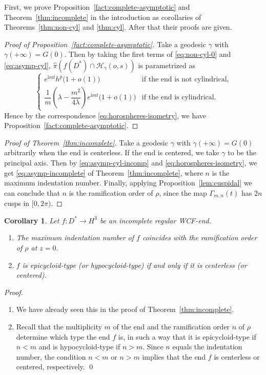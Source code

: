 \documentclass[a4paper]{amsart}
\theoremstyle{plain}
\newtheorem{corollary}[theorem]{Corollary}
\theoremstyle{remark}
\numberwithin{equation}{section}
\begin{document}
First, we prove Proposition~\ref{fact:complete-asymptotic}
and Theorem~\ref{thm:incomplete} in the introduction
as corollaries of Theorems~\ref{thm:non-cyl} and \ref{thm:cyl}.
After that their proofs are given.
\begin{proof}[Proof of Proposition~\ref{fact:complete-asymptotic}]
 Take a geodesic $\gamma$ with $\gamma(+\infty)=G(0)$.
 Then by taking the first terms of \eqref{eq:non-cyl-0} and
 \eqref{eq:asymp-cyl},
 $\hat \pi(f(D^*)\cap {\mathcal{H}}_{\gamma}(o,s))$ is parametrized as 
 \[
    \begin{cases}
      e^{{\mathrm{i}} m t}h^p\bigl(1+o(1)\bigr)\qquad
        &\text{if the end is not cylindrical},\\[6pt]
      \dfrac{1}{m}\left(\lambda-\dfrac{m^2}{4\lambda}\right)
      e^{{\mathrm{i}} m t}\bigl(1+o(1)\bigr)
        &\text{if the end is cylindrical}.
    \end{cases}
 \]    
 Hence by the correspondence \eqref{eq:horospheres-isometry},
 we have Proposition~\ref{fact:complete-asymptotic}.
\end{proof}
\begin{proof}[Proof of Theorem~\ref{thm:incomplete}]
 Take a geodesic $\gamma$ with $\gamma(+\infty)=G(0)$
 arbitrarily when the end is centerless.
 If the end is centered, we take $\gamma$
 to be the principal axis.
 Then by  \eqref{eq:asymp-cyl-incomp} and
 \eqref{eq:horospheres-isometry},
 we get \eqref{eq:asymp-incomplete} of
 Theorem~\ref{thm:incomplete}, where $n$ is the maximum indentation
 number.
 Finally, applying  Proposition~\ref{lem:cuspidal} we can
 conclude that
 $n$ is the ramification order of $\rho$,
 since the map ${\varGamma}_{m,n}(t)$ has $2n$ cusps in $[0,2\pi)$.
\end{proof}

\begin{corollary}\label{cor:maxind=ram}
Let $f\colon D^* \to H^3$ be an incomplete regular WCF-end. 
\begin{enumerate}
 \item \label{cor:maxind=ram-1}
The maximum indentation number of $f$ 
 coincides with the ramification order of $\rho$ at $z=0$.  
 \item $f$ is  epicycloid-type (or hypocycloid-type)
if and only if it is centerless (or centered). 
\end{enumerate}
\end{corollary}
{\it Proof.} 
 \begin{enumerate}
  \item We have already seen this 
in the proof of Theorem~\ref{thm:incomplete}. 
 \item Recall that the multiplicity $m$ of the end and 
the ramification order $n$ of $\rho$ determine 
which type the end $f$ is,  
in such a way that it is epicycloid-type if $n <m$ and 
 is hypocycloid-type if $n > m$.  
Since $n$ equals the indentation number, 
the condition $n<m$ or $n>m$ implies that the end $f$ 
is centerless or centered, respectively.   
\hfill \qed
 \end{enumerate}
\end{document}
